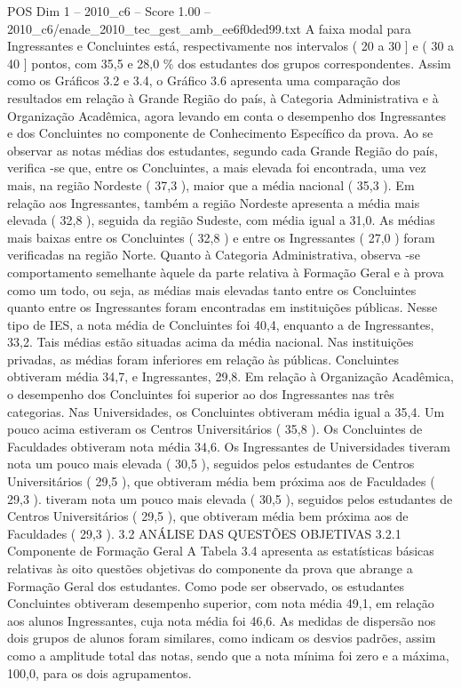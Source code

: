 \begin{textsample}{POS Dim 1 – 2010\_c6 – Score 1.00 – 2010\_c6/enade\_2010\_tec\_gest\_amb\_ee6f0ded99.txt}
A faixa modal para Ingressantes e Concluintes está, respectivamente nos intervalos ( 20 a 30 ] e ( 30 a 40 ] pontos, com 35,5 e 28,0 \% dos estudantes dos grupos correspondentes.
Assim como os Gráficos 3.2 e 3.4, o Gráfico 3.6 apresenta uma comparação dos resultados em relação à Grande Região do país, à Categoria Administrativa e à Organização Acadêmica, agora levando em conta o desempenho dos Ingressantes e dos Concluintes no componente de Conhecimento Específico da prova.
Ao se observar as notas médias dos estudantes, segundo cada Grande Região do país, verifica -se que, entre os Concluintes, a mais elevada foi encontrada, uma vez mais, na região Nordeste ( 37,3 ), maior que a média nacional ( 35,3 ).
Em relação aos Ingressantes, também a região Nordeste apresenta a média mais elevada ( 32,8 ), seguida da região Sudeste, com média igual a 31,0.
As médias mais baixas entre os Concluintes ( 32,8 ) e entre os Ingressantes ( 27,0 ) foram verificadas na região Norte.
Quanto à Categoria Administrativa, observa -se comportamento semelhante àquele da parte relativa à Formação Geral e à prova como um todo, ou seja, as médias mais elevadas tanto entre os Concluintes quanto entre os Ingressantes foram encontradas em instituições públicas.
Nesse tipo de IES, a nota média de Concluintes foi 40,4, enquanto a de Ingressantes, 33,2.
Tais médias estão situadas acima da média nacional.
Nas instituições privadas, as médias foram inferiores em relação às públicas.
Concluintes obtiveram média 34,7, e Ingressantes, 29,8.
Em relação à Organização Acadêmica, o desempenho dos Concluintes foi superior ao dos Ingressantes nas três categorias.
Nas Universidades, os Concluintes obtiveram média igual a 35,4.
Um pouco acima estiveram os Centros Universitários ( 35,8 ).
Os Concluintes de Faculdades obtiveram nota média 34,6.
Os Ingressantes de Universidades tiveram nota um pouco mais elevada ( 30,5 ), seguidos pelos estudantes de Centros Universitários ( 29,5 ), que obtiveram média bem próxima aos de Faculdades ( 29,3 ). tiveram nota um pouco mais elevada ( 30,5 ), seguidos pelos estudantes de Centros Universitários ( 29,5 ), que obtiveram média bem próxima aos de Faculdades ( 29,3 ). 3.2 ANÁLISE DAS QUESTÕES OBJETIVAS 3.2.1 Componente de Formação Geral A Tabela 3.4 apresenta as estatísticas básicas relativas às oito questões objetivas do componente da prova que abrange a Formação Geral dos estudantes.
Como pode ser observado, os estudantes Concluintes obtiveram desempenho superior, com nota média 49,1, em relação aos alunos Ingressantes, cuja nota média foi 46,6.
As medidas de dispersão nos dois grupos de alunos foram similares, como indicam os desvios padrões, assim como a amplitude total das notas, sendo que a nota mínima foi zero e a máxima, 100,0, para os dois agrupamentos.

\end{textsample}
